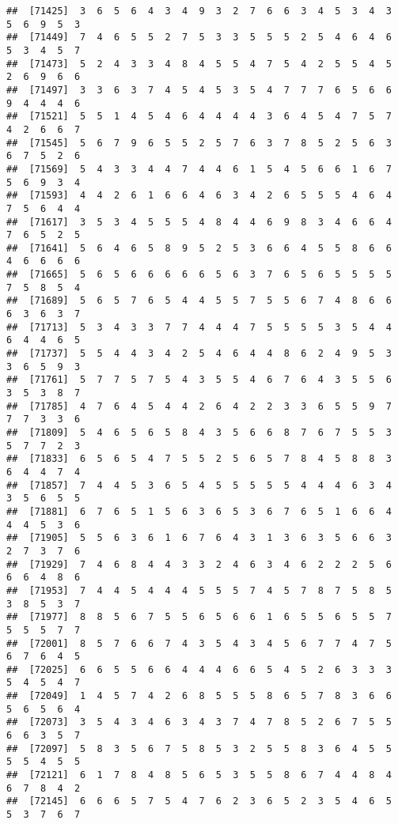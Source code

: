 \documentclass[
]{book}
\begin{document}
\begin{verbatim}
##  [71425]  3  6  5  6  4  3  4  9  3  2  7  6  6  3  4  5  3  4  3  5  6  9  5  3
##  [71449]  7  4  6  5  5  2  7  5  3  3  5  5  5  2  5  4  6  4  6  5  3  4  5  7
##  [71473]  5  2  4  3  3  4  8  4  5  5  4  7  5  4  2  5  5  4  5  2  6  9  6  6
##  [71497]  3  3  6  3  7  4  5  4  5  3  5  4  7  7  7  6  5  6  6  9  4  4  4  6
##  [71521]  5  5  1  4  5  4  6  4  4  4  4  3  6  4  5  4  7  5  7  4  2  6  6  7
##  [71545]  5  6  7  9  6  5  5  2  5  7  6  3  7  8  5  2  5  6  3  6  7  5  2  6
##  [71569]  5  4  3  3  4  4  7  4  4  6  1  5  4  5  6  6  1  6  7  5  6  9  3  4
##  [71593]  4  4  2  6  1  6  6  4  6  3  4  2  6  5  5  5  4  6  4  7  5  6  4  4
##  [71617]  3  5  3  4  5  5  5  4  8  4  4  6  9  8  3  4  6  6  4  7  6  5  2  5
##  [71641]  5  6  4  6  5  8  9  5  2  5  3  6  6  4  5  5  8  6  6  4  6  6  6  6
##  [71665]  5  6  5  6  6  6  6  6  5  6  3  7  6  5  6  5  5  5  5  7  5  8  5  4
##  [71689]  5  6  5  7  6  5  4  4  5  5  7  5  5  6  7  4  8  6  6  6  3  6  3  7
##  [71713]  5  3  4  3  3  7  7  4  4  4  7  5  5  5  5  3  5  4  4  6  4  4  6  5
##  [71737]  5  5  4  4  3  4  2  5  4  6  4  4  8  6  2  4  9  5  3  3  6  5  9  3
##  [71761]  5  7  7  5  7  5  4  3  5  5  4  6  7  6  4  3  5  5  6  3  5  3  8  7
##  [71785]  4  7  6  4  5  4  4  2  6  4  2  2  3  3  6  5  5  9  7  7  7  3  3  6
##  [71809]  5  4  6  5  6  5  8  4  3  5  6  6  8  7  6  7  5  5  3  5  7  7  2  3
##  [71833]  6  5  6  5  4  7  5  5  2  5  6  5  7  8  4  5  8  8  3  6  4  4  7  4
##  [71857]  7  4  4  5  3  6  5  4  5  5  5  5  5  4  4  4  6  3  4  3  5  6  5  5
##  [71881]  6  7  6  5  1  5  6  3  6  5  3  6  7  6  5  1  6  6  4  4  4  5  3  6
##  [71905]  5  5  6  3  6  1  6  7  6  4  3  1  3  6  3  5  6  6  3  2  7  3  7  6
##  [71929]  7  4  6  8  4  4  3  3  2  4  6  3  4  6  2  2  2  5  6  6  6  4  8  6
##  [71953]  7  4  4  5  4  4  4  5  5  5  7  4  5  7  8  7  5  8  5  3  8  5  3  7
##  [71977]  8  8  5  6  7  5  5  6  5  6  6  1  6  5  5  6  5  5  7  5  5  5  7  7
##  [72001]  8  5  7  6  6  7  4  3  5  4  3  4  5  6  7  7  4  7  5  6  7  6  4  5
##  [72025]  6  6  5  5  6  6  4  4  4  6  6  5  4  5  2  6  3  3  3  5  4  5  4  7
##  [72049]  1  4  5  7  4  2  6  8  5  5  5  8  6  5  7  8  3  6  6  5  6  5  6  4
##  [72073]  3  5  4  3  4  6  3  4  3  7  4  7  8  5  2  6  7  5  5  6  6  3  5  7
##  [72097]  5  8  3  5  6  7  5  8  5  3  2  5  5  8  3  6  4  5  5  5  5  4  5  5
##  [72121]  6  1  7  8  4  8  5  6  5  3  5  5  8  6  7  4  4  8  4  6  7  8  4  2
##  [72145]  6  6  6  5  7  5  4  7  6  2  3  6  5  2  3  5  4  6  5  5  3  7  6  7

\end{verbatim}
\end{document}
